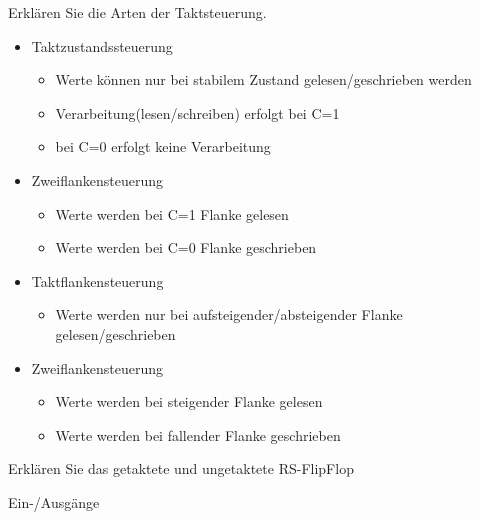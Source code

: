 \documentclass
[
  draft    = true,
  fontsize = 11pt,
  parskip  = half-,
  BCOR     = 0pt,
  DIV      = 11,
  ngerman,
  dvipsnames
]
{scrartcl}
\begin{document}
\begin{mytemize}
\begin{karsten}
\begin{itemize}
	  	\end{itemize}
	  \end{karsten}
  \item Erklären Sie die Arten der Taktsteuerung.
	  \begin{karsten}
	  	\begin{itemize}
	  		\item Taktzustandssteuerung
	  			\begin{itemize}
	  				\item Werte können nur bei stabilem Zustand gelesen/geschrieben werden
	  				\item Verarbeitung(lesen/schreiben) erfolgt bei C=1
	  				\item bei C=0 erfolgt keine Verarbeitung
	  			\end{itemize}
	  	\end{itemize}
  		\begin{itemize}
	  		\item Zweiflankensteuerung
	  		\begin{itemize}
	  			\item Werte werden bei C=1 Flanke gelesen
	  			\item Werte werden bei C=0 Flanke geschrieben
	  		\end{itemize}
  		\end{itemize}
	  	\begin{itemize}
	  		\item Taktflankensteuerung
	  			\begin{itemize}
	  				\item Werte werden nur bei aufsteigender/absteigender Flanke gelesen/geschrieben
	  			\end{itemize}
	  	\end{itemize}
		\begin{itemize}
			\item Zweiflankensteuerung
				\begin{itemize}
					\item Werte werden bei steigender Flanke gelesen
					\item Werte werden bei fallender Flanke geschrieben
				\end{itemize}
		\end{itemize}
	  \end{karsten}
  \item Erklären Sie das getaktete und ungetaktete RS-FlipFlop
        \begin{mytemize}
          \item Ein-/Ausgänge

\end{mytemize}
\end{mytemize}
\end{document}
